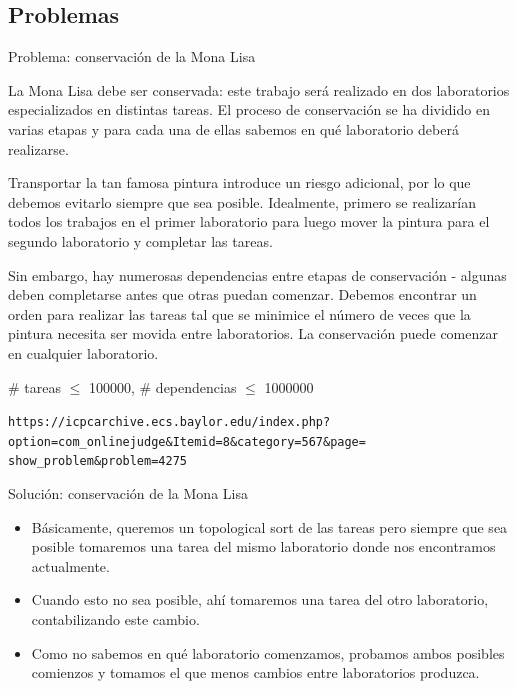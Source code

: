 \documentclass[compress]{beamer}
\begin{document}
\subsection{Problemas}
\begin{frame}{Problema: conservación de la Mona Lisa}

{ \scriptsize
La Mona Lisa debe ser conservada: este trabajo será realizado en dos
laboratorios especializados en distintas tareas. El proceso de 
conservación se ha dividido en varias etapas y para cada una de ellas 
sabemos en qué laboratorio deberá realizarse.
\bigskip

Transportar la tan famosa pintura introduce un riesgo adicional, por lo
que debemos evitarlo siempre que sea posible. Idealmente, primero se
realizarían todos los trabajos en el primer laboratorio para luego mover
la pintura para el segundo laboratorio y completar las tareas.
\bigskip

Sin embargo, hay numerosas dependencias entre etapas de conservación -
algunas deben completarse antes que otras puedan comenzar. Debemos
encontrar un orden para realizar las tareas tal que se minimice el
número de veces que la pintura necesita ser movida entre laboratorios.
La conservación puede comenzar en cualquier laboratorio.
\bigskip

\# tareas $\leq$ 100000, \# dependencias $\leq$ 1000000
\bigskip

\texttt{https://icpcarchive.ecs.baylor.edu/index.php?
option=com\_onlinejudge\&Itemid=8\&category=567\&page=
show\_problem\&problem=4275}

}
\end{frame}

\begin{frame}{Solución: conservación de la Mona Lisa}

\begin{itemize}
\item Básicamente, queremos un topological sort de las tareas pero 
siempre que sea posible tomaremos una tarea del mismo laboratorio donde
nos encontramos actualmente.
\item Cuando esto no sea posible, ahí tomaremos una tarea del otro
laboratorio, contabilizando este cambio.
\item Como no sabemos en qué laboratorio comenzamos, probamos ambos
posibles comienzos y tomamos el que menos cambios entre laboratorios
produzca.
\end{itemize}

\end{frame}
\end{document}
